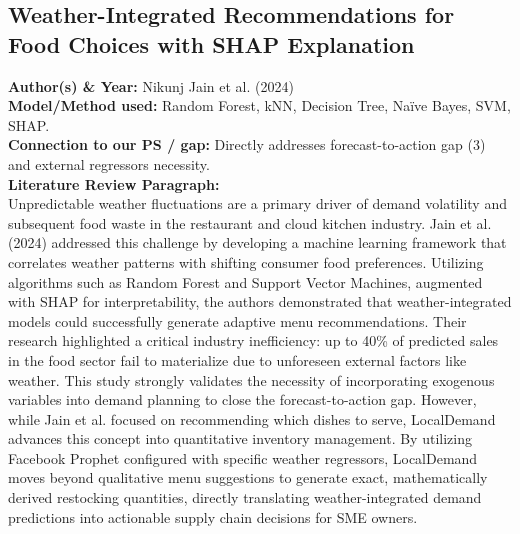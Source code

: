 \documentclass[conference]{IEEEtran}
\begin{document}
\subsection{Weather-Integrated Recommendations for Food Choices with SHAP Explanation}
\textbf{Author(s) \& Year:} Nikunj Jain et al. (2024)\\
\textbf{Model/Method used:} Random Forest, kNN, Decision Tree, Naïve Bayes, SVM, SHAP.\\
\textbf{Connection to our PS / gap:} Directly addresses forecast-to-action gap (3) and external regressors necessity.\\
\textbf{Literature Review Paragraph:}\\
Unpredictable weather fluctuations are a primary driver of demand volatility and subsequent food waste in the restaurant and cloud kitchen industry. Jain et al. (2024) addressed this challenge by developing a machine learning framework that correlates weather patterns with shifting consumer food preferences. Utilizing algorithms such as Random Forest and Support Vector Machines, augmented with SHAP for interpretability, the authors demonstrated that weather-integrated models could successfully generate adaptive menu recommendations. Their research highlighted a critical industry inefficiency: up to 40\% of predicted sales in the food sector fail to materialize due to unforeseen external factors like weather. This study strongly validates the necessity of incorporating exogenous variables into demand planning to close the forecast-to-action gap. However, while Jain et al. focused on recommending which dishes to serve, LocalDemand advances this concept into quantitative inventory management. By utilizing Facebook Prophet configured with specific weather regressors, LocalDemand moves beyond qualitative menu suggestions to generate exact, mathematically derived restocking quantities, directly translating weather-integrated demand predictions into actionable supply chain decisions for SME owners.
\end{document}
